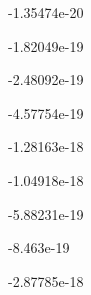 \begin{DoxyCode}
                                                               
    -1.35474e-20                                                                                           
                                                                                                                  
                                                               
    -1.82049e-19                                                                                           
                                                                                                                  
                                                               
    -2.48092e-19                                                                                           
                                                                                                                  
                    
    -4.57754e-19                                                                                           
                                                                                                                  
                                                               
    -1.28163e-18                                                                                           
                                                                                                                  
                                                               
    -1.04918e-18                                                                                           
                                                                                                                  
                                                               
    -5.88231e-19                                                                                           
                                                                                                                  
                                                               
    -8.463e-19                                                                                             
                                                                                                                  
                                                               
    -2.87785e-18                                                                                           
                                                                                                                  

\end{DoxyCode}
